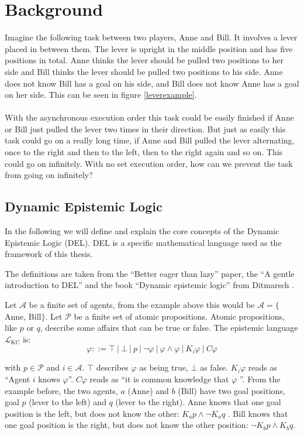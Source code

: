 \chapter{Background}\label{chap:background}

Imagine the following task between two players, Anne and Bill. It  involves a lever placed in between them. The lever is upright in the middle position and has five positions in total. Anne thinks the lever should be pulled two positions to her side and Bill thinks the lever should be pulled two positions to his side.
Anne does not know Bill has a goal on his side, and Bill does not know Anne has a goal on her side.
This can be seen in figure \ref{leverexample}.\\
 \\

With the asynchronous execution order this task could be easily finished if Anne or Bill just pulled the lever two times in their direction. But just as easily this task could go on a really long time, if Anne and Bill pulled the lever alternating, once to the right and then to the left, then to the right again and so on. This could go on infinitely. With no set execution order, how can we prevent the task from going on infinitely?

\section{Dynamic Epistemic Logic}
In the following we will define and explain the core concepts of the Dynamic Epistemic Logic (DEL). DEL is a specific mathematical language used as the framework of this thesis.

The definitions are taken from the ``Better eager than lazy'' \cite{bolander2018better} paper, the ``A gentle introduction to DEL'' \cite{bolander2017gentle} and the book ``Dynamic epistemic logic'' from Ditmarsch \cite{Ditmarsch2007}.

Let $\mathcal{A}$ be a finite set of agents, from the example above this would be $\mathcal{A} =\{$Anne, Bill$\}$. Let $\mathcal{P}$ be a finite set of atomic propositions. Atomic propositions, like $p$ or $q$, describe some affairs that can be true or false.
The epistemic language $\mathcal{L}_{\text{KC}}$ is: \\
$$
\varphi ::= \top \ | \ \bot \ | \ p \ | \ \neg \varphi \ | \ \varphi \wedge \varphi \ | \ K_i \varphi \ | \ C\varphi
$$

with $p \in \mathcal{P}$ and $i \in \mathcal{A}$.
$\top$ describes $\varphi$ as being true, $\bot$ as false.
$K_i \varphi$ reads as ``Agent $i$ knows $\varphi$''. $C \varphi$ reads as ``it is common knowledge that $\varphi$ ''.
From the example before, the two agents, $a$ (Anne) and $b$ (Bill) have two goal positions, goal $p$ (lever to the left) and $q$ (lever to the right). Anne knows that one goal position is the left, but does not know the other: $K_a p \wedge \neg K_a q$ . Bill knows that one goal position is the right, but does not know the other position: $\neg K_b  p \wedge K_b q$.


